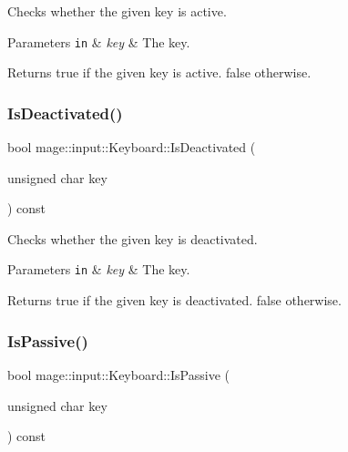 Checks whether the given key is active.


\begin{DoxyParams}[1]{Parameters}
\mbox{\tt in}  & {\em key} & The key. \\
\hline
\end{DoxyParams}
\begin{DoxyReturn}{Returns}
{\ttfamily true} if the given key is active. {\ttfamily false} otherwise. 
\end{DoxyReturn}
\mbox{\label{classmage_1_1input_1_1_keyboard_a3c38020c099d0b1e8a3a083e146da7fa}} 
\subsubsection{\texorpdfstring{Is\+Deactivated()}{IsDeactivated()}}
{\footnotesize\ttfamily bool mage\+::input\+::\+Keyboard\+::\+Is\+Deactivated (\begin{DoxyParamCaption}\item[{unsigned char}]{key }\end{DoxyParamCaption}) const\hspace{0.3cm}{\ttfamily [noexcept]}}

Checks whether the given key is deactivated.


\begin{DoxyParams}[1]{Parameters}
\mbox{\tt in}  & {\em key} & The key. \\
\hline
\end{DoxyParams}
\begin{DoxyReturn}{Returns}
{\ttfamily true} if the given key is deactivated. {\ttfamily false} otherwise. 
\end{DoxyReturn}
\mbox{\label{classmage_1_1input_1_1_keyboard_a28806b2bc716e6849be259b7aa2956a7}} 
\subsubsection{\texorpdfstring{Is\+Passive()}{IsPassive()}}
{\footnotesize\ttfamily bool mage\+::input\+::\+Keyboard\+::\+Is\+Passive (\begin{DoxyParamCaption}\item[{unsigned char}]{key }\end{DoxyParamCaption}) const\hspace{0.3cm}{\ttfamily [noexcept]}}

